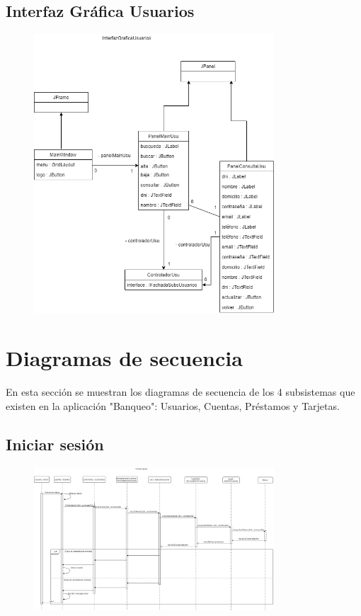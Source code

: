 \documentclass[12pt]{article}
\begin{document}
\subsection{Interfaz Gráfica Usuarios}
\begin{figure}[H]
    \centering
    \includegraphics[width=0.8\textwidth]{images/InterfazGraficaUsuarios1.png}
\end{figure}

\newpage
\section{Diagramas de secuencia} %
En esta sección se muestran los diagramas de secuencia de los 4 subsistemas que existen en la aplicación "Banqueo": Usuarios, Cuentas, Préstamos y Tarjetas.
\subsection{Iniciar sesión}
\begin{figure}[H]
    \centering
    \includegraphics[width=0.8\textwidth]{images/iniciar_sesion.png}
\end{figure}
\end{document}
